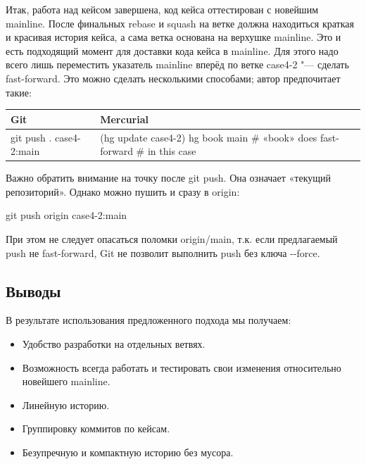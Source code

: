\documentclass[10pt, a5paper]{article}
\begin{document}
Итак, работа над кейсом завершена, код кейса оттестирован с новейшим mainline. После финальных rebase и squash на ветке должна находиться краткая и красивая история кейса, а сама ветка основана на верхушке mainline. Это и есть подходящий момент для доставки кода кейса в mainline. Для этого надо всего лишь переместить указатель mainline вперёд по ветке case4-2 "--- сделать fast-forward. Это можно сделать несколькими способами; автор предпочитает такие:

\begin{table}
  \centering
  \begin{tabular}{P{3.5cm}|P{6cm}} \hline
    \textbf{Git}                       & \textbf{Mercurial}            \\ \hline
     git push . case4-2:main      & (hg update case4-2) \linebreak
                               hg book main \linebreak  \# «book» does fast-forward \linebreak
                               \# in this case                                               \\ \hline
  \end{tabular}
\end{table}
Важно обратить внимание на точку после git push. Она означает «текущий репозиторий». Однако можно пушить и сразу в origin:

git push origin case4-2:main

При этом не следует опасаться поломки origin/main, т.к. если предлагаемый push не fast-forward, Git не позволит выполнить push без ключа -{}-force.

\subsection*{Выводы}

В результате использования предложенного подхода мы получаем:

\begin{itemize}
  \item Удобство разработки на отдельных ветвях.
  \item Возможность всегда работать и тестировать свои изменения относительно новейшего mainline.
  \item Линейную историю.
  \item Группировку коммитов по кейсам.
  \item Безупречную и компактную историю без мусора.
\end{itemize}
\end{document}
